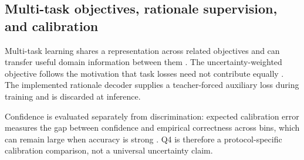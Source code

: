 \subsection{Multi-task objectives, rationale supervision, and calibration}
Multi-task learning shares a representation across related objectives and can transfer useful domain information between them \citep{caruana1997multitask}. The uncertainty-weighted objective follows the motivation that task losses need not contribute equally \citep{kendall2018multitask}. The implemented rationale decoder supplies a teacher-forced auxiliary loss during training and is discarded at inference.

Confidence is evaluated separately from discrimination: expected calibration error measures the gap between confidence and empirical correctness across bins, which can remain large when accuracy is strong \citep{guo2017calibration}. Q4 is therefore a protocol-specific calibration comparison, not a universal uncertainty claim.
